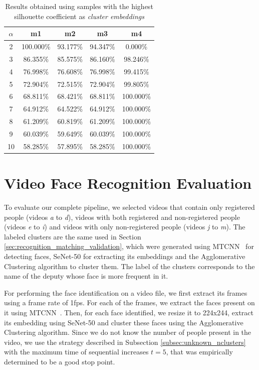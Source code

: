 \begin{table}[!ht]
\centering
\small
\caption{Results obtained using samples with the highest silhouette coefficient as \emph{cluster embeddings}}
\label{tab:results_silhouette}
\begin{tabular}{ccccc}
\hline
\textbf{$\alpha$} & \textbf{m1} & \textbf{m2} & \textbf{m3} & \textbf{m4} \\ \hline
2 & 100.000\% & 93.177\% & 94.347\% & 0.000\% \\
3 & 86.355\% & 85.575\% & 86.160\% & 98.246\% \\
4 & 76.998\% & 76.608\% & 76.998\% & 99.415\% \\
5 & 72.904\% & 72.515\% & 72.904\% & 99.805\% \\
6 & 68.811\% & 68.421\% & 68.811\% & 100.000\% \\
7 & 64.912\% & 64.522\% & 64.912\% & 100.000\% \\
8 & 61.209\% & 60.819\% & 61.209\% & 100.000\% \\
9 & 60.039\% & 59.649\% & 60.039\% & 100.000\% \\
10 & 58.285\% & 57.895\% & 58.285\% & 100.000\%
\end{tabular}
\end{table}

\section{Video Face Recognition Evaluation}
\label{sec:recognition_video_evaluation}

To evaluate our complete pipeline, we selected videos that contain only registered people (videos \emph{a} to \emph{d}), videos with both registered and non-registered people (videos \emph{e} to \emph{i}) and videos with only non-registered people (videos \emph{j} to \emph{m}).
The labeled clusters are the same used in Section \ref{sec:recognition_matching_validation}, which were generated using MTCNN~\cite{mtcnn} for detecting faces, SeNet-50 for extracting its embeddings and the Agglomerative Clustering algorithm to cluster them. 
The label of the clusters corresponds to the name of the deputy whose face is more frequent in it.

For performing the face identification on a video file, we first extract its frames using a frame rate of 1fps. 
For each of the frames, we extract the faces present on it using MTCNN~\cite{mtcnn}. 
Then, for each face identified, we resize it to 224x244, extract its embedding using SeNet-50 and cluster these faces using the Agglomerative Clustering algorithm.
Since we do not know the number of people present in the video, we use the strategy described in Subsection \ref{subsec:unknown_nclusters} with the maximum time of sequential increases $t=5$, that was empirically determined to be a good stop point.

